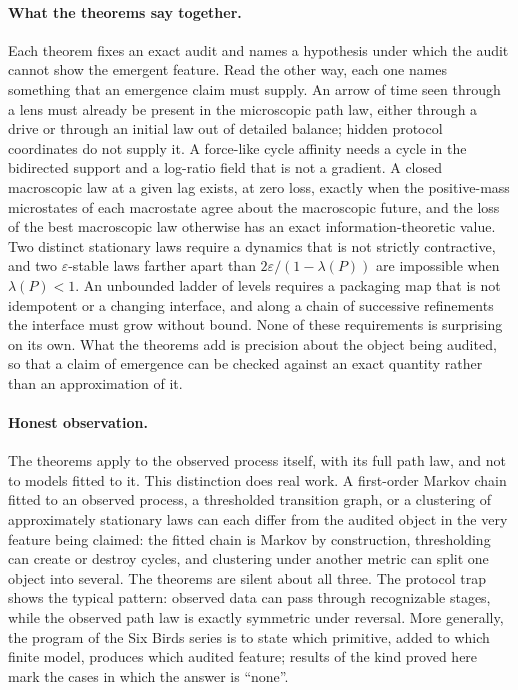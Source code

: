 \documentclass[11pt]{article}
\theoremstyle{definition}
\newcommand{\1}{\mathbf{1}}
\begin{document}
\paragraph{What the theorems say together.}
Each theorem fixes an exact audit and names a hypothesis under which the audit cannot show the emergent feature.
Read the other way, each one names something that an emergence claim must supply.
An arrow of time seen through a lens must already be present in the microscopic path law, either through a drive or through an initial law out of detailed balance; hidden protocol coordinates do not supply it.
A force-like cycle affinity needs a cycle in the bidirected support and a log-ratio field that is not a gradient.
A closed macroscopic law at a given lag exists, at zero loss, exactly when the positive-mass microstates of each macrostate agree about the macroscopic future, and the loss of the best macroscopic law otherwise has an exact information-theoretic value.
Two distinct stationary laws require a dynamics that is not strictly contractive, and two $\varepsilon$-stable laws farther apart than $2\varepsilon/(1-\lambda(P))$ are impossible when $\lambda(P)<1$.
An unbounded ladder of levels requires a packaging map that is not idempotent or a changing interface, and along a chain of successive refinements the interface must grow without bound.
None of these requirements is surprising on its own.
What the theorems add is precision about the object being audited, so that a claim of emergence can be checked against an exact quantity rather than an approximation of it.

\paragraph{Honest observation.}
The theorems apply to the observed process itself, with its full path law, and not to models fitted to it.
This distinction does real work.
A first-order Markov chain fitted to an observed process, a thresholded transition graph, or a clustering of approximately stationary laws can each differ from the audited object in the very feature being claimed: the fitted chain is Markov by construction, thresholding can create or destroy cycles, and clustering under another metric can split one object into several. The theorems are silent about all three.
The protocol trap shows the typical pattern: observed data can pass through recognizable stages, while the observed path law is exactly symmetric under reversal.
More generally, the program of the Six Birds series \citep{SB_FOUNDATIONS,SB_PROTOCOL_TRAP,SB_CAST} is to state which primitive, added to which finite model, produces which audited feature; results of the kind proved here mark the cases in which the answer is ``none''.
\end{document}
